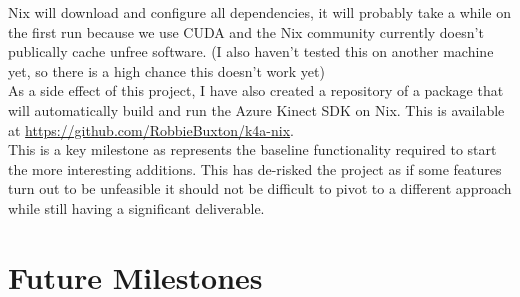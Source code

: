 Nix will download and configure all dependencies, it will probably take a while on the first run because we use CUDA and the Nix community currently doesn't publically cache unfree software. (I also haven't tested this on another machine yet, so there is a high chance this doesn't work yet) \\

As a side effect of this project, I have also created a repository of a package that will automatically build and run the Azure Kinect SDK on Nix. This is available at \url{https://github.com/RobbieBuxton/k4a-nix}. \\

This is a key milestone as represents the baseline functionality required to start the more interesting additions. This has de-risked the project as if some features turn out to be unfeasible it should not be difficult to pivot to a different approach while still having a significant deliverable.

\section{Future Milestones}
